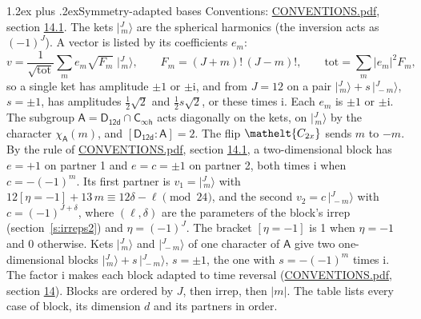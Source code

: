 \documentclass[10pt,a4paper]{article}
\makeatletter
\renewcommand\section{\@startsection{section}{1}{\z@}{-3ex plus -1ex minus -.2ex}%
  {1.2ex plus .2ex}{\normalfont\large\sffamily\bfseries\color{parttitle}}}
\numberwithin{equation}{section}
\newcommand{\eltfont}[1]{{\let\sigma\eltsigma\mathelt{#1}}}
\newcommand{\grp}[1]{\mathsf{#1}}
\newcommand{\elt}[1]{\eltfont{#1}}
\newcommand{\grpindex}[2]{[#1 : #2]}
\newcommand{\iverson}[1]{[#1]}
\newcommand{\iunit}{\mathrm{i}}
\newcommand{\chiA}{\chi_{\grp{A}}}
\newcommand{\jm}[2]{\bigl\lvert{}^{#1}_{\,#2}\bigr\rangle}
\makeatother
\begin{document}
\section{Symmetry-adapted bases}\label{s:bases}
Conventions: \href{../../CONVENTIONS.pdf}{CONVENTIONS.pdf}, section \href{../../CONVENTIONS.pdf\#conv.14.1}{14.1}.
\leavevmode\label{n:index.m}\label{n:vector.ket}The kets $\jm{J}{m}$ are the spherical harmonics (the inversion acts as $(-1)^J$). \label{n:index.ketcoefficient}\label{n:vector.basis.symmetry}\label{n:index.ketweight}\label{n:index.total}A vector is listed by its coefficients $e_m$:
\begin{equation}\label{e:ket}v = \frac{1}{\sqrt{\mathrm{tot}}}\sum_m e_m\sqrt{F_m}\;\jm{J}{m},\qquad F_m = (J+m)!\,(J-m)!,\qquad \mathrm{tot} = \sum_m |e_m|^2F_m,\end{equation}
\leavevmode\label{n:index.pair.sign}so a single ket has amplitude $\pm1$ or $\pm\iunit$, and from $J = 12$ on a pair $\jm{J}{m} + s\,\jm{J}{-m}$, $s = \pm1$, has amplitudes $\tfrac{1}{2}\sqrt{2}$ and $\tfrac{1}{2}s\sqrt{2}$, or these times $\iunit$. Each $e_m$ is $\pm1$ or $\pm\iunit$.
\leavevmode\label{n:group.A}\label{n:function.character.abelian}The subgroup $\grp{A} = \grp{D_{12d}}\cap\grp{C_{\infty h}}$ acts diagonally on the kets, on $\jm{J}{m}$ by the character $\chiA(m)$, and $\grpindex{\grp{D_{12d}}}{\grp{A}} = 2$. The flip $\elt{C_{2x}}$ sends $m$ to $-m$. \label{n:index.partner.sign}By the rule of \href{../../CONVENTIONS.pdf}{CONVENTIONS.pdf}, section \href{../../CONVENTIONS.pdf\#conv.14.1}{14.1}, a two-dimensional block has $e = +1$ on partner 1 and $e = c = \pm1$ on partner 2, both times $\iunit$ when $c = -(-1)^m$. \label{n:index.eta}Its first partner is $v_1 = \jm{J}{m}$ with $12\iverson{\eta = -1} + 13\,m \equiv 12\delta - \ell \pmod{24}$, and the second $v_2 = c\,\jm{J}{-m}$ with $c = (-1)^{J+\delta}$, where $(\ell, \delta)$ are the parameters of the block's irrep (section~\ref{s:irreps2}) and $\eta = (-1)^J$. The bracket $\iverson{\eta = -1}$ is 1 when $\eta = -1$ and 0 otherwise. Kets $\jm{J}{m}$ and $\jm{J}{-m}$ of one character of $\grp{A}$ give two one-dimensional blocks $\jm{J}{m} + s\,\jm{J}{-m}$, $s = \pm1$, the one with $s = -(-1)^m$ times $\iunit$. The factor $\iunit$ makes each block adapted to time reversal (\href{../../CONVENTIONS.pdf}{CONVENTIONS.pdf}, section \href{../../CONVENTIONS.pdf\#conv.14}{14}). Blocks are ordered by $J$, then irrep, then $|m|$.
\leavevmode\label{n:head.case}\label{n:head.partners}The table lists every case of block, its dimension $d$ and its partners in order.
\end{document}
